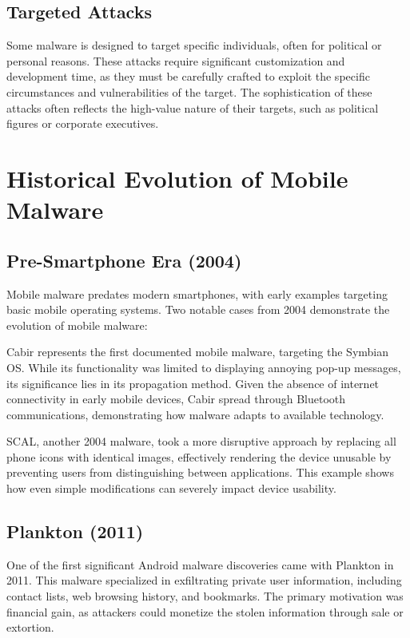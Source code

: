 \documentclass{article}
\begin{document}
\subsection{Targeted Attacks}
Some malware is designed to target specific individuals, often for political or personal reasons. These attacks require significant customization and development time, as they must be carefully crafted to exploit the specific circumstances and vulnerabilities of the target. The sophistication of these attacks often reflects the high-value nature of their targets, such as political figures or corporate executives.

\section{Historical Evolution of Mobile Malware}

\subsection{Pre-Smartphone Era (2004)}
Mobile malware predates modern smartphones, with early examples targeting basic mobile operating systems. Two notable cases from 2004 demonstrate the evolution of mobile malware:

Cabir represents the first documented mobile malware, targeting the Symbian OS. While its functionality was limited to displaying annoying pop-up messages, its significance lies in its propagation method. Given the absence of internet connectivity in early mobile devices, Cabir spread through Bluetooth communications, demonstrating how malware adapts to available technology.

SCAL, another 2004 malware, took a more disruptive approach by replacing all phone icons with identical images, effectively rendering the device unusable by preventing users from distinguishing between applications. This example shows how even simple modifications can severely impact device usability.

\subsection{Plankton (2011)}
One of the first significant Android malware discoveries came with Plankton in 2011. This malware specialized in exfiltrating private user information, including contact lists, web browsing history, and bookmarks. The primary motivation was financial gain, as attackers could monetize the stolen information through sale or extortion.
\end{document}
